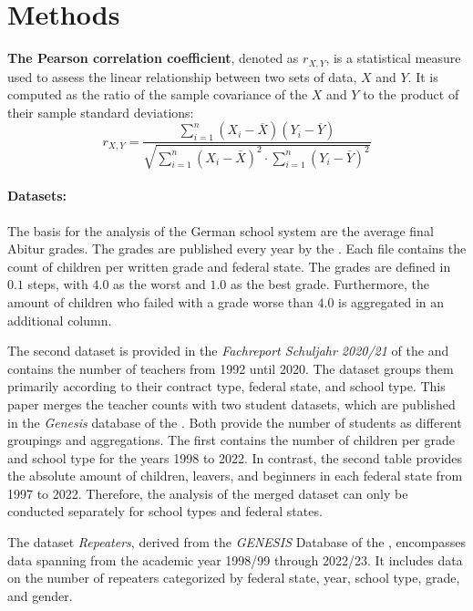 \section*{Methods}



\textbf{The Pearson correlation coefficient}, denoted as $r_{X,Y}$, is a statistical measure used to assess the linear relationship between two sets of data, $X$ and $Y$. It is computed as the ratio of the sample covariance of the $X$ and $Y$ to the product of their sample standard deviations: %
\begin{equation}
    r_{X,Y} = \frac{\sum_{i=1}^n (X_i - \overline{X}) (Y_i - \overline{Y})}{\sqrt{\sum_{i=1}^n(X_i-\overline{X})^2 \cdot \sum_{i=1}^n(Y_i-\overline{Y})^2}}
\end{equation}


\paragraph{Datasets:}
The basis for the analysis of the German school system are the average final Abitur grades. The grades are published every year by the \citeauthor{kultusminister_konferenz_abiturnoten_nodate}. Each file contains the count of children per written grade and federal state. The grades are defined in $0.1$ steps, with $4.0$ as the worst and $1.0$ as the best grade. Furthermore, the amount of children who failed with a grade worse than $4.0$ is aggregated in an additional column.

The second dataset is provided in the \textit{Fachreport Schuljahr 2020/21} of the \citeauthor{statistische_bundesamt_allgemeinbildende_2022} and contains the number of teachers from 1992 until 2020. The dataset groups them primarily according to their contract type, federal state, and school type. This paper merges the teacher counts with two student datasets, which are published in the \textit{Genesis} database of the \citeauthor{statistische_bundesamt_statistisches_2023}. Both provide the number of students as different groupings and aggregations. The first contains the number of children per grade and school type  for the years 1998 to 2022. In contrast, the second table provides the absolute amount of children, leavers, and beginners in each federal state from 1997 to 2022. Therefore, the analysis of the merged dataset can only be conducted separately for school types and federal states.

The dataset \textit{Repeaters}, derived from the \textit{GENESIS} Database of the \citeauthor{statistische_bundesamt_statistisches_2023}, encompasses data spanning from the academic year 1998/99 through 2022/23.  It includes data on the number of repeaters categorized by federal state, year, school type, grade, and gender. 

